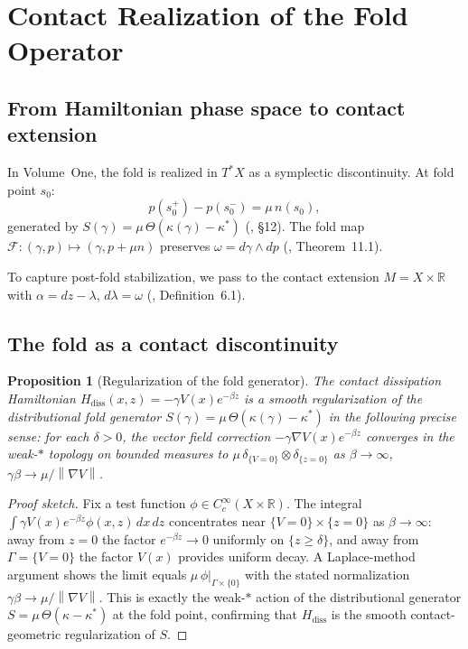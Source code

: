 \documentclass[12pt, oneside]{book}
\theoremstyle{plain}
\newtheorem{proposition}[theorem]{Proposition}
\theoremstyle{definition}
\theoremstyle{remark}
\newcommand{\R}{\mathbb{R}}
\newcommand{\Orb}{\Gamma}
\newcommand{\norm}[1]{\left\|#1\right\|}
\begin{document}
\section{Contact Realization of the Fold Operator}
\label{sec:contact-fold}

\subsection{From Hamiltonian phase space to contact extension}

In Volume~One, the fold is realized in $T^*X$ as a symplectic
discontinuity. At fold point $s_0$:
\[
  p(s_0^+) - p(s_0^-) = \mu\,n(s_0),
\]
generated by $S(\gamma) = \mu\,\Theta(\kappa(\gamma)-\kappa^*)$
(\cite{PO1}, \S12). The fold map
$\mathcal{F}:(\gamma,p)\mapsto(\gamma,p+\mu n)$
preserves $\omega = d\gamma\wedge dp$
(\cite{PO1}, Theorem~11.1).

To capture post-fold stabilization, we pass to the contact
extension $M = X\times\R$ with $\alpha = dz - \lambda$,
$d\lambda=\omega$ (\cite{Paper1}, Definition~6.1).

\subsection{The fold as a contact discontinuity}

\begin{proposition}[Regularization of the fold generator]
\label{prop:regularization}
The contact dissipation Hamiltonian
$H_{\mathrm{diss}}(x,z) = -\gamma V(x)e^{-\beta z}$
is a smooth regularization of the distributional fold generator
$S(\gamma) = \mu\,\Theta(\kappa(\gamma)-\kappa^*)$
in the following precise sense: for each $\delta>0$, the
vector field correction $-\gamma\nabla V(x)e^{-\beta z}$
converges in the weak-$*$ topology on bounded measures to
$\mu\,\delta_{\{V=0\}}\otimes\delta_{\{z=0\}}$ as
$\beta\to\infty$, $\gamma\beta\to\mu/\norm{\nabla V}$.
\end{proposition}

\begin{proof}[Proof sketch]
Fix a test function $\phi\in C_c^\infty(X\times\R)$.
The integral $\int \gamma V(x)e^{-\beta z}\phi(x,z)\,dx\,dz$
concentrates near $\{V=0\}\times\{z=0\}$ as $\beta\to\infty$:
away from $z=0$ the factor $e^{-\beta z}\to 0$ uniformly on
$\{z\ge\delta\}$, and away from $\Orb=\{V=0\}$ the factor
$V(x)$ provides uniform decay. A Laplace-method argument shows
the limit equals $\mu\,\phi|_{\Orb\times\{0\}}$ with the
stated normalization $\gamma\beta\to\mu/\norm{\nabla V}$.
This is exactly the weak-$*$ action of the distributional
generator $S = \mu\,\Theta(\kappa-\kappa^*)$ at the fold
point, confirming that $H_{\mathrm{diss}}$ is the smooth
contact-geometric regularization of $S$.
\end{proof}
\end{document}
